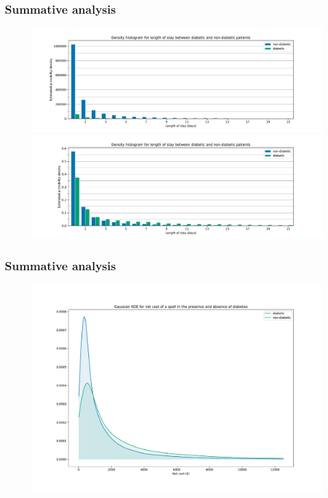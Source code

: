 \documentclass{beamer}
\begin{document}
\begin{frame}
    \frametitle{Summative analysis}

    \begin{figure}
        \begin{minipage}{\linewidth}
        \includegraphics[width=\linewidth]{./img/diabetic_LOS_freq_hist.pdf}
        \end{minipage}
        \begin{minipage}{\linewidth}
        \includegraphics[width=\linewidth]{./img/diabetic_LOS_density_hist.pdf}
        \end{minipage}
    \end{figure}
\end{frame}

\begin{frame}
    \frametitle{Summative analysis}

    \begin{figure}
        \includegraphics[width=\linewidth]{./img/diabetic_netcost_kde.pdf}
    \end{figure}
\end{frame}
\end{document}

